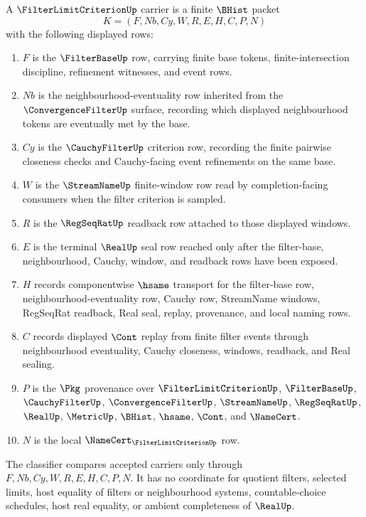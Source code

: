 \begin{definition}\label{def:filter-limit-criterion-carrier}
A $\FilterLimitCriterionUp$ carrier is a finite $\BHist$ packet
$$
K=(F,Nb,Cy,W,R,E,H,C,P,N)
$$
with the following displayed rows:
\begin{enumerate}
\item $F$ is the $\FilterBaseUp$ row, carrying finite base tokens, finite-intersection discipline, refinement witnesses, and event rows.
\item $Nb$ is the neighbourhood-eventuality row inherited from the $\ConvergenceFilterUp$ surface, recording which displayed neighbourhood tokens are eventually met by the base.
\item $Cy$ is the $\CauchyFilterUp$ criterion row, recording the finite pairwise closeness checks and Cauchy-facing event refinements on the same base.
\item $W$ is the $\StreamNameUp$ finite-window row read by completion-facing consumers when the filter criterion is sampled.
\item $R$ is the $\RegSeqRatUp$ readback row attached to those displayed windows.
\item $E$ is the terminal $\RealUp$ seal row reached only after the filter-base, neighbourhood, Cauchy, window, and readback rows have been exposed.
\item $H$ records componentwise $\hsame$ transport for the filter-base row, neighbourhood-eventuality row, Cauchy row, StreamName windows, RegSeqRat readback, Real seal, replay, provenance, and local naming rows.
\item $C$ records displayed $\Cont$ replay from finite filter events through neighbourhood eventuality, Cauchy closeness, windows, readback, and Real sealing.
\item $P$ is the $\Pkg$ provenance over $\FilterLimitCriterionUp$, $\FilterBaseUp$, $\CauchyFilterUp$, $\ConvergenceFilterUp$, $\StreamNameUp$, $\RegSeqRatUp$, $\RealUp$, $\MetricUp$, $\BHist$, $\hsame$, $\Cont$, and $\NameCert$.
\item $N$ is the local $\NameCert_{\FilterLimitCriterionUp}$ row.
\end{enumerate}
The classifier compares accepted carriers only through $F,Nb,Cy,W,R,E,H,C,P,N$. It has no coordinate for quotient filters, selected limits, host equality of filters or neighbourhood systems, countable-choice schedules, host real equality, or ambient completeness of $\RealUp$.
\end{definition}

